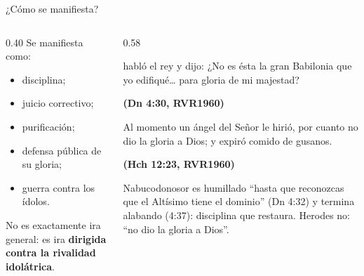 \documentclass[hyperref={bookmarks=false},aspectratio=169]{beamer}
\newcommand{\fuente}[1]{\par\hfill{\upshape\bfseries\footnotesize\textcolor{azul}{#1}}}
\newcommand{\destacar}[1]{\textbf{\textcolor{azul}{#1}}}
\begin{document}
\begin{frame}{¿Cómo se manifiesta?}
\begin{columns}[t,onlytextwidth]
\begin{column}{0.40\textwidth}\small
Se manifiesta como:
\begin{itemize}
\item disciplina;
\item juicio correctivo;
\item purificación;
\item defensa pública de su gloria;
\item guerra contra los ídolos.
\end{itemize}
\begin{tcolorbox}[colback=papiro,colframe=dorado,boxrule=1.2pt,arc=3pt]
\scriptsize No es exactamente ira general: es ira \destacar{dirigida contra la rivalidad idolátrica}.
\end{tcolorbox}
\end{column}
\begin{column}{0.58\textwidth}
\begin{cita}habló el rey y dijo: ¿No es ésta la gran Babilonia que yo edifiqué\ldots{} para gloria de mi majestad?\fuente{(Dn 4:30, RVR1960)}\end{cita}
\begin{cita}Al momento un ángel del Señor le hirió, por cuanto no dio la gloria a Dios; y expiró comido de gusanos.\fuente{(Hch 12:23, RVR1960)}\end{cita}
\scriptsize Nabucodonosor es humillado ``hasta que reconozcas que el Altísimo tiene el dominio'' (Dn 4:32) y termina alabando (4:37): disciplina que restaura. Herodes no: ``no dio la gloria a Dios''.
\end{column}
\end{columns}
\end{frame}
\end{document}
